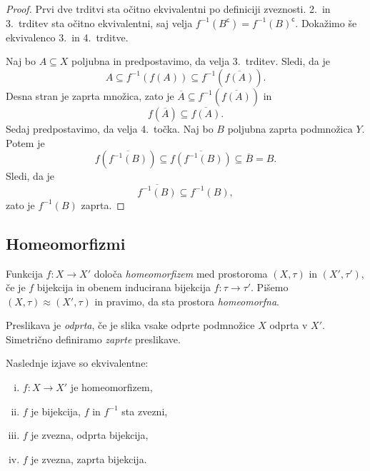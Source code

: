 \begin{proof}
Prvi dve trditvi sta očitno ekvivalentni po definiciji zveznosti.
2.\ in 3.\ trditev sta očitno ekvivalentni, saj velja
$f^{-1}(B^\mathsf{c}) = f^{-1}(B)^\mathsf{c}$. Dokažimo še
ekvivalenco 3.\ in 4.\ trditve.

Naj bo $A\subseteq X$ poljubna in predpostavimo, da velja 3.\
trditev. Sledi, da je
\[
A \subseteq f^{-1}(f(A)) \subseteq f^{-1}(\overline{f(A)}).
\]
Desna stran je zaprta množica, zato je
$\overline{A} \subseteq f^{-1}(\overline{f(A)})$ in
\[
f(\overline{A}) \subseteq \overline{f(A)}.
\]
Sedaj predpostavimo, da velja 4.\ točka. Naj bo $B$ poljubna zaprta
podmnožica $Y$. Potem je
\[
f(\overline{f^{-1}(B)}) \subseteq \overline{f(f^{-1}(B))}
\subseteq \overline{B} = B.
\]
Sledi, da je
\[
\overline{f^{-1}(B)} \subseteq f^{-1}(B),
\]
zato je $f^{-1}(B)$ zaprta.
\end{proof}

\newpage

\subsection{Homeomorfizmi}


\begin{okvir}
\begin{definicija}
Funkcija $f \colon X \to X'$ določa
\emph{homeomorfizem}
med prostoroma $(X,\tau)$ in $(X',\tau')$, če je $f$
bijekcija in obenem inducirana bijekcija
$f \colon \tau \to \tau'$. Pišemo
$(X,\tau) \approx (X',\tau)$ in pravimo, da sta
prostora \emph{homeomorfna}.
\end{definicija}
\end{okvir}

\begin{definicija}
Preslikava je \emph{odprta}, če je
slika vsake odprte podmnožice $X$ odprta v $X'$. Simetrično
definiramo \emph{zaprte} preslikave.
\end{definicija}

\begin{trditev}
Naslednje izjave so ekvivalentne:

\begin{enumerate}[i)]
\item $f \colon X \to X'$ je homeomorfizem,
\item $f$ je bijekcija, $f$ in $f^{-1}$ sta zvezni,
\item $f$ je zvezna, odprta bijekcija,
\item $f$ je zvezna, zaprta bijekcija.
\end{enumerate}
\end{trditev}


